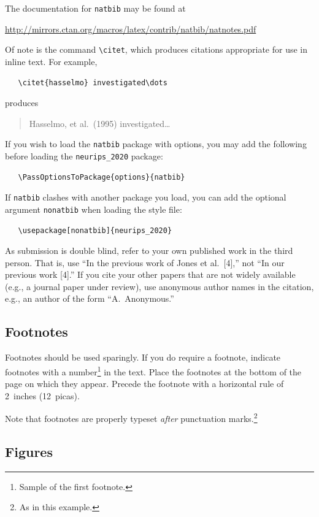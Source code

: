 \documentclass{article}
\begin{document}
The documentation for \verb+natbib+ may be found at
\begin{center}
  \url{http://mirrors.ctan.org/macros/latex/contrib/natbib/natnotes.pdf}
\end{center}
Of note is the command \verb+\citet+, which produces citations appropriate for
use in inline text.  For example,
\begin{verbatim}
   \citet{hasselmo} investigated\dots
\end{verbatim}
produces
\begin{quote}
  Hasselmo, et al.\ (1995) investigated\dots
\end{quote}

If you wish to load the \verb+natbib+ package with options, you may add the
following before loading the \verb+neurips_2020+ package:
\begin{verbatim}
   \PassOptionsToPackage{options}{natbib}
\end{verbatim}

If \verb+natbib+ clashes with another package you load, you can add the optional
argument \verb+nonatbib+ when loading the style file:
\begin{verbatim}
   \usepackage[nonatbib]{neurips_2020}
\end{verbatim}

As submission is double blind, refer to your own published work in the third
person. That is, use ``In the previous work of Jones et al.\ [4],'' not ``In our
previous work [4].'' If you cite your other papers that are not widely available
(e.g., a journal paper under review), use anonymous author names in the
citation, e.g., an author of the form ``A.\ Anonymous.''

\subsection{Footnotes}

Footnotes should be used sparingly.  If you do require a footnote, indicate
footnotes with a number\footnote{Sample of the first footnote.} in the
text. Place the footnotes at the bottom of the page on which they appear.
Precede the footnote with a horizontal rule of 2~inches (12~picas).

Note that footnotes are properly typeset \emph{after} punctuation
marks.\footnote{As in this example.}

\subsection{Figures}
\end{document}
